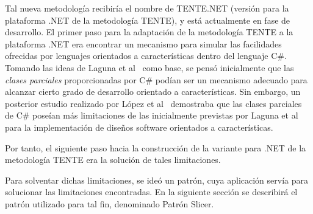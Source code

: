Tal nueva metodología recibiría el nombre de TENTE.NET (versión para la plataforma .NET de la metodología TENTE), y está actualmente en fase de desarrollo. El primer paso para la adaptación de la metodología TENTE a la plataforma .NET era encontrar un mecanismo para simular las facilidades ofrecidas por lenguajes orientados a características dentro del lenguaje C\#. Tomando las ideas de Laguna et al~\cite{laguna:2007} como base, se pensó inicialmente que las \emph{clases parciales} proporcionadas por C\# podían ser un mecanismo adecuado para alcanzar cierto grado de desarrollo orientado a características. Sin embargo, un posterior estudio realizado por López et al~\cite{elio:2010} demostraba que las clases parciales de C\# poseían más limitaciones de las inicialmente previstas por Laguna et al para la implementación de diseños software orientados a características.

Por tanto, el siguiente paso hacia la construcción de la variante para .NET de la metodología TENTE era la solución de tales limitaciones. 

Para solventar dichas limitaciones, se ideó un patrón, cuya aplicación servía para solucionar las limitaciones encontradas. En la siguiente sección se describirá el patrón utilizado para tal fin, denominado Patrón Slicer.
